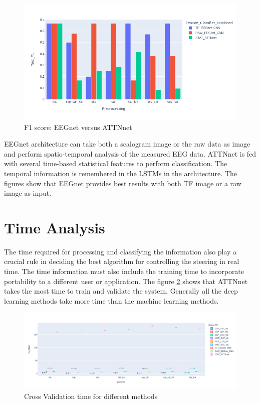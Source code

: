      \begin{figure}[H] 
     \begin{center}
        \includegraphics[width=1.0\textwidth]{images/preproc_test_f1_dl_bar.png}
        \caption{F1 score: EEGnet versus ATTNnet}
        \label{fig:preproc_test_f1_dl}
        \end{center}
    \end{figure}

EEGnet architecture can take both a scalogram image or the raw data as image and perform spatio-temporal analysis of the measured EEG data. ATTNnet is fed with several time-based statistical features to perform classification. The temporal information is remembered in the LSTMs in the architecture. The figures show that EEGnet provides best results with both TF image or a raw image as input.

\section{Time Analysis}
The time required for processing and classifying the information also play a crucial rule in deciding the best algorithm for controlling the steering in real time. The time information must also include the training time to incorporate portability to a different user or application. The figure \ref{fig:preproc_cv_time_feat} shows that ATTNnet takes the most time to train and validate the system. Generally all the deep learning methods take more time than the machine learning methods.
     \begin{figure}[H] 
     \begin{center}
        \includegraphics[width=1.0\textwidth]{images/preproc_cv_time_feat.png}
        \caption{Cross Validation time for different methods}
        \label{fig:preproc_cv_time_feat}
        \end{center}
    \end{figure}
    
